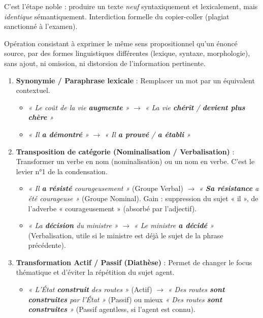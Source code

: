 \documentclass[11pt]{article}
\newcommand{\cle}[1]{{\popxbold\color{popdark}#1}}
\begin{document}
C'est l'étape noble : produire un texte \emph{neuf} syntaxiquement et lexicalement, mais \emph{identique} sémantiquement. Interdiction formelle du \cle{copier-coller} (plagiat sanctionné à l'examen).

\begin{definition}
Opération consistant à exprimer le même sens propositionnel qu'un énoncé source, par des formes linguistiques différentes (lexique, syntaxe, morphologie), sans ajout, ni omission, ni distorsion de l'information pertinente.
\end{definition}

\begin{propriete}
\begin{enumerate}
\item \textbf{Synonymie / Paraphrase lexicale} : Remplacer un mot par un équivalent contextuel.
    \begin{itemize}
    \item \textit{« Le coût de la vie \textbf{augmente} »} $\rightarrow$ \textit{« La vie \textbf{chérît} / \textbf{devient plus chère} »}
    \item \textit{« Il \textbf{a démontré} »} $\rightarrow$ \textit{« Il \textbf{a prouvé} / \textbf{a établi} »}
    \end{itemize}
\item \textbf{Transposition de catégorie (Nominalisation / Verbalisation)} : Transformer un verbe en nom (nominalisation) ou un nom en verbe. C'est le levier n°1 de la condensation.
    \begin{itemize}
    \item \textit{« Il \textbf{a résisté} courageusement »} (Groupe Verbal) $\rightarrow$ \textit{« \textbf{Sa résistance} a été courageuse »} (Groupe Nominal). Gain : suppression du sujet « il », de l'adverbe « courageusement » (absorbé par l'adjectif).
    \item \textit{« La \textbf{décision} du ministre »} $\rightarrow$ \textit{« Le ministre \textbf{a décidé} »} (Verbalisation, utile si le ministre est déjà le sujet de la phrase précédente).
    \end{itemize}
\item \textbf{Transformation Actif / Passif (Diathèse)} : Permet de changer le focus thématique et d'éviter la répétition du sujet agent.
    \begin{itemize}
    \item \textit{« L'État \textbf{construit} des routes »} (Actif) $\rightarrow$ \textit{« Des routes \textbf{sont construites} par l'État »} (Passif) ou mieux \textit{« Des routes \textbf{sont construites} »} (Passif agentless, si l'agent est connu).

\end{itemize}
\end{enumerate}
\end{propriete}
\end{document}
